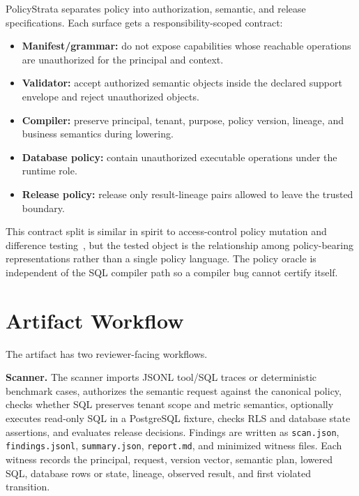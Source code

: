 \documentclass[sigconf,review,anonymous]{acmart}
\newcommand{\tool}{PolicyStrata}
\begin{document}
\tool{} separates policy into authorization, semantic, and release
specifications. Each surface gets a responsibility-scoped contract:

\begin{itemize}
  \item \textbf{Manifest/grammar:} do not expose capabilities whose reachable
  operations are unauthorized for the principal and context.
  \item \textbf{Validator:} accept authorized semantic objects inside the
  declared support envelope and reject unauthorized objects.
  \item \textbf{Compiler:} preserve principal, tenant, purpose, policy version,
  lineage, and business semantics during lowering.
  \item \textbf{Database policy:} contain unauthorized executable operations
  under the runtime role.
  \item \textbf{Release policy:} release only result-lineage pairs allowed to
  leave the trusted boundary.
\end{itemize}

This contract split is similar in spirit to access-control policy mutation and
difference testing~\cite{xacml_mutation,margrave}, but the tested object is the
relationship among policy-bearing representations rather than a single policy
language. The policy oracle is independent of the SQL compiler path so a compiler
bug cannot certify itself.

\section{Artifact Workflow}

The artifact has two reviewer-facing workflows.

\textbf{Scanner.} The scanner imports JSONL tool/SQL traces or deterministic
benchmark cases, authorizes the semantic request against the canonical policy,
checks whether SQL preserves tenant scope and metric semantics, optionally
executes read-only SQL in a PostgreSQL fixture, checks RLS and database state
assertions, and evaluates release decisions. Findings are written as
\texttt{scan.json}, \texttt{findings.jsonl}, \texttt{summary.json},
\texttt{report.md}, and minimized witness files. Each witness records the
principal, request, version vector, semantic plan, lowered SQL, database rows or
state, lineage, observed result, and first violated transition.
\end{document}

